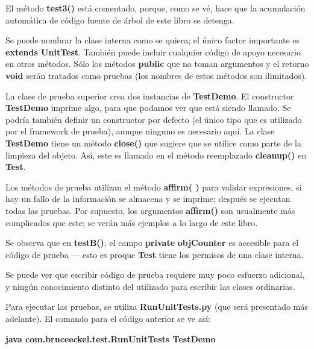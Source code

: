 El método \textbf{test3()} está comentado, porque, como se vé, hace que la acumulación automática de código fuente de árbol de este libro se detenga.  \newline

Se puede nombrar la clase interna como se quiera; el único factor importante es \textbf{extends UnitTest}. También puede incluir cualquier código de apoyo necesario en otros métodos. Sólo los métodos \textbf{public} que no toman argumentos y el retorno \textbf{void} serán tratados como pruebas (los nombres de estos métodos son ilimitados).  \newline

La clase de prueba superior crea dos instancias de \textbf{TestDemo}. El constructor \textbf{TestDemo}  imprime algo, para que podamos ver que está siendo llamado. Se podría también definir un constructor por defecto (el único tipo que es utilizado por el framework de prueba), aunque ninguno es necesario aquí. La clase \textbf{TestDemo} tiene un método \textbf{close()} que sugiere que se utilice como parte de la limpieza del objeto. Así, este es llamado en el método reemplazado \textbf{cleanup()} en \textbf{Test}.   \newline

Los métodos de prueba utilizan el método \textbf{affirm( )} para validar expresiones, si hay un fallo de la información se almacena y se imprime; después se ejecutan todas las pruebas. Por supuesto, los argumentos \textbf{affirm()} son usualmente más complicados que este; se verán más ejemplos a lo largo de este libro.    \newline

Se observa que en \textbf{testB()}, el campo \textbf{private } \textbf{objCounter} es accesible para el código de prueba — esto es proque \textbf{Test} tiene los permisos de una clase interna.  \newline

Se puede ver que escribir código de prueba requiere muy poco esfuerzo adicional, y ningún conocimiento distinto del utilizado para escribir las clases ordinarias.  \newline

Para ejecutar las pruebas, se utiliza \textbf{RunUnitTests.py} (que será presentado más adelante). El comando para el código anterior se ve así:   \newline

\textbf{java com.bruceeckel.test.RunUnitTests TestDemo} \newline

